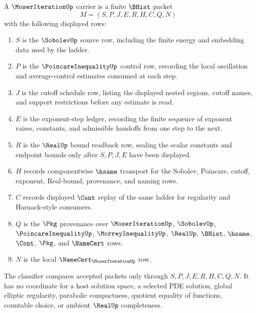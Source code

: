 \begin{definition}
\label{def:moser-iteration-carrier}
A $\MoserIterationUp$ carrier is a finite $\BHist$ packet
$$
M=(S,P,J,E,R,H,C,Q,N)
$$
with the following displayed rows:
\begin{enumerate}
\item $S$ is the $\SobolevUp$ source row, including the finite energy and embedding data used by the ladder.
\item $P$ is the $\PoincareInequalityUp$ control row, recording the local oscillation and average-control estimates consumed at each step.
\item $J$ is the cutoff schedule row, listing the displayed nested regions, cutoff names, and support restrictions before any estimate is read.
\item $E$ is the exponent-step ledger, recording the finite sequence of exponent raises, constants, and admissible handoffs from one step to the next.
\item $R$ is the $\RealUp$ bound readback row, sealing the scalar constants and endpoint bounds only after $S,P,J,E$ have been displayed.
\item $H$ records componentwise $\hsame$ transport for the Sobolev, Poincare, cutoff, exponent, Real-bound, provenance, and naming rows.
\item $C$ records displayed $\Cont$ replay of the same ladder for regularity and Harnack-style consumers.
\item $Q$ is the $\Pkg$ provenance over $\MoserIterationUp$, $\SobolevUp$, $\PoincareInequalityUp$, $\MorreyInequalityUp$, $\RealUp$, $\BHist$, $\hsame$, $\Cont$, $\Pkg$, and $\NameCert$ rows.
\item $N$ is the local $\NameCert_{\MoserIterationUp}$ row.
\end{enumerate}
The classifier compares accepted packets only through $S,P,J,E,R,H,C,Q,N$. It has no coordinate for a host solution space, a selected PDE solution, global elliptic regularity, parabolic compactness, quotient equality of functions, countable choice, or ambient $\RealUp$ completeness.
\end{definition}

